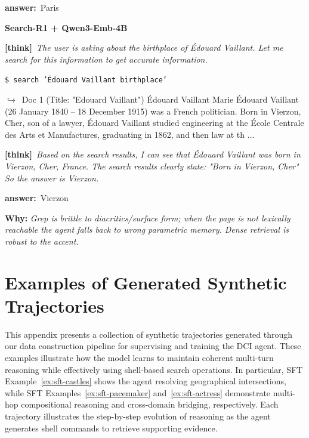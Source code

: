 \documentclass{llmxive}
\providecommand{\cmark}{\ding{51}}
\providecommand{\thk}[1]{{\footnotesize\textbf{[think]}\ \textit{#1}\par}}
\providecommand{\cmd}[1]{{\footnotesize\texttt{\$\ #1}\par}}
\providecommand{\retr}[1]{{\footnotesize\quad$\hookrightarrow$\ #1\par}}
\providecommand{\ans}[1]{{\footnotesize\textbf{answer:}\ #1\par}}
\begin{document}
\begin{cmpbox}[label={ex:popqa-vaillant},title={\ \ \textsc{PopQA -- diacritic / surface-form brittleness}}]
  \ans{Paris}
\smallskip\par\textbf{Search-R1 + Qwen3-Emb-4B}~\cmark\par
  \thk{The user is asking about the birthplace of Édouard Vaillant. Let me search for this information to get accurate information.}
  \cmd{search 'Édouard Vaillant birthplace'}
  \retr{Doc 1 (Title: "Edouard Vaillant") Édouard Vaillant Marie Édouard Vaillant (26 January 1840 – 18 December 1915) was a French politician. Born in Vierzon, Cher, son of a lawyer, Édouard Vaillant studied engineering at the École Centrale des Arts et Manufactures, graduating in 1862, and then law at th ...}
  \thk{Based on the search results, I can see that Édouard Vaillant was born in Vierzon, Cher, France. The search results clearly state: "Born in Vierzon, Cher" So the answer is Vierzon.}
  \ans{Vierzon}
\smallskip\par\textbf{Why:} \textit{Grep is brittle to diacritics/surface form; when the page is not lexically reachable the agent falls back to wrong parametric memory. Dense retrieval is robust to the accent.}
\end{cmpbox}\bigskip


\section{Examples of Generated Synthetic Trajectories}
\label{app:sft-examples}


This appendix presents a collection of synthetic trajectories generated through our data construction pipeline for supervising and training the DCI agent. These examples illustrate how the model learns to maintain coherent multi-turn reasoning while effectively using shell-based search operations. In particular, SFT Example~\ref{ex:sft-castles} shows the agent resolving geographical intersections, while SFT Examples~\ref{ex:sft-pacemaker} and~\ref{ex:sft-actress} demonstrate multi-hop compositional reasoning and cross-domain bridging, respectively. Each trajectory illustrates the step-by-step evolution of reasoning as the agent generates shell commands to retrieve supporting evidence.
\end{document}
